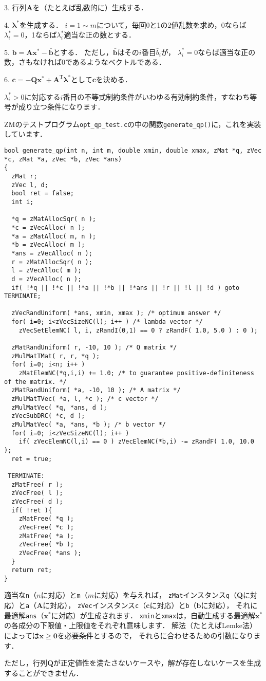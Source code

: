 ﻿\documentclass[a4paper]{jsarticle}
\begin{document}
3. 行列$\boldsymbol{A}$を（たとえば乱数的に）生成する．

4. $\boldsymbol{\lambda}^{*}$を生成する．
$i=1\sim m$について，毎回0と1の2値乱数を求め，0ならば$\lambda_{i}^{*}=0$，1ならば$\lambda_{i}^{*}$適当な正の数とする．

5. $\boldsymbol{b}=\boldsymbol{A}\boldsymbol{x}^{*}-\bar{\boldsymbol{b}}$とする．
ただし，$\bar{\boldsymbol{b}}$はその$i$番目$\bar{b}_{i}$が，
$\lambda_{i}^{*}=0$ならば適当な正の数，さもなければ0であるようなベクトルである．

6. $\boldsymbol{c}=-\boldsymbol{Q}\boldsymbol{x}^{*}+\boldsymbol{A}^{\mathrm{T}}\boldsymbol{\lambda}^{*}$として$\boldsymbol{c}$を決める．

$\lambda_{i}^{*}>0$に対応する$i$番目の不等式制約条件がいわゆる有効制約条件，すなわち等号が成り立つ条件になります．


ZMのテストプログラム\verb|opt_qp_test.c|の中の関数\verb|generate_qp()|に，これを実装しています．
\begin{verbatim}
bool generate_qp(int n, int m, double xmin, double xmax, zMat *q, zVec *c, zMat *a, zVec *b, zVec *ans)
{
  zMat r;
  zVec l, d;
  bool ret = false;
  int i;

  *q = zMatAllocSqr( n );
  *c = zVecAlloc( n );
  *a = zMatAlloc( m, n );
  *b = zVecAlloc( m );
  *ans = zVecAlloc( n );
  r = zMatAllocSqr( n );
  l = zVecAlloc( m );
  d = zVecAlloc( n );
  if( !*q || !*c || !*a || !*b || !*ans || !r || !l || !d ) goto TERMINATE;

  zVecRandUniform( *ans, xmin, xmax ); /* optimum answer */
  for( i=0; i<zVecSizeNC(l); i++ ) /* lambda vector */
    zVecSetElemNC( l, i, zRandI(0,1) == 0 ? zRandF( 1.0, 5.0 ) : 0 );

  zMatRandUniform( r, -10, 10 ); /* Q matrix */
  zMulMatTMat( r, r, *q );
  for( i=0; i<n; i++ )
    zMatElemNC(*q,i,i) += 1.0; /* to guarantee positive-definiteness of the matrix. */
  zMatRandUniform( *a, -10, 10 ); /* A matrix */
  zMulMatTVec( *a, l, *c ); /* c vector */
  zMulMatVec( *q, *ans, d );
  zVecSubDRC( *c, d );
  zMulMatVec( *a, *ans, *b ); /* b vector */
  for( i=0; i<zVecSizeNC(l); i++ )
    if( zVecElemNC(l,i) == 0 ) zVecElemNC(*b,i) -= zRandF( 1.0, 10.0 );
  ret = true;

 TERMINATE:
  zMatFree( r );
  zVecFree( l );
  zVecFree( d );
  if( !ret ){
    zMatFree( *q );
    zVecFree( *c );
    zMatFree( *a );
    zVecFree( *b );
    zVecFree( *ans );
  }
  return ret;
}
\end{verbatim}

適当な\verb|n|（$n$に対応）と\verb|m|（$m$に対応）を与えれば，
\verb|zMat|インスタンス\verb|q|（$\boldsymbol{Q}$に対応）と\verb|a|（$\boldsymbol{A}$に対応），
\verb|zVec|インスタンス\verb|c|（$\boldsymbol{c}$に対応）と\verb|b|（$\boldsymbol{b}$に対応），
それに最適解\verb|ans|（$\boldsymbol{x}^{*}$に対応）が生成されます．
\verb|xmin|と\verb|xmax|は，自動生成する最適解$\boldsymbol{x}^{*}$の各成分の下限値・上限値をそれぞれ意味します．
解法（たとえばLemke法）によっては$\boldsymbol{x}\geq\boldsymbol{0}$を必要条件とするので，
それらに合わせるための引数になります．

ただし，行列$\boldsymbol{Q}$が正定値性を満たさないケースや，解が存在しないケースを生成することができません．
\end{document}
